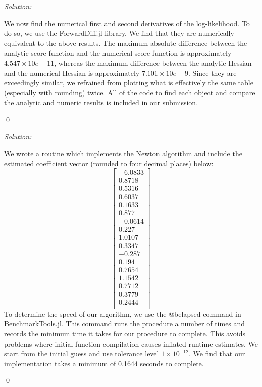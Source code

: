\documentclass[12pt]{article}
\newenvironment{problem}[2][Problem]{\begin{trivlist}
\item[\hskip \labelsep {\bfseries #1}\hskip \labelsep {\bfseries #2.}]}{\end{trivlist}}
\newenvironment{sol}
    {\emph{Solution:}
    }
    {
    \qed
    }
\begin{document}
\begin{problem}{2}
\end{problem}
\begin{sol}
    We now find the numerical first and second derivatives of the log-likelihood. To do so, we use the ForwardDiff.jl library. We find that they are numerically equivalent to the above results. The maximum absolute difference between the analytic score function and the numerical score function is approximately $4.547 \times 10e-11$, whereas the maximum difference between the analytic Hessian and the numerical Hessian is approximately $7.101 \times 10e-9$. Since they are exceedingly similar, we refrained from plotting what is effectively the same table (especially with rounding) twice. All of the code to find each object and compare the analytic and numeric results is included in our submission. 
\end{sol}
\begin{problem}{3}
\end{problem}
\begin{sol}
    We wrote a routine which implements the Newton algorithm and include the estimated coefficient vector (rounded to four decimal places) below:
    \[\left[
\begin{array}{c}
-6.0833 \\
0.8718 \\
0.5316 \\
0.6037 \\
0.1633 \\
0.877 \\
-0.0614 \\
0.227 \\
1.0107 \\
0.3347 \\
-0.287 \\
0.194 \\
0.7654 \\
1.1542 \\
0.7712 \\
0.3779 \\
0.2444 \\
\end{array}
\right]\]
To determine the speed of our algorithm, we use the @belapsed command in BenchmarkTools.jl. This command runs the procedure a number of times and records the minimum time it takes for our procedure to complete. This avoids problems where initial function compilation causes inflated runtime estimates. We start from the initial guess and use tolerance level $1 \times 10^{-12}$. We find that our implementation takes a minimum of 0.1644 seconds to complete.
\end{sol}
\end{document}
